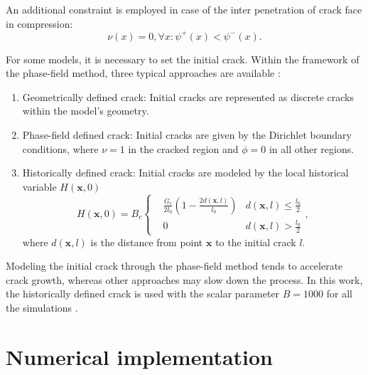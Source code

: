 \documentclass[times,fleqn,11pt]{elsarticle}
\begin{document}
An additional constraint is employed in case of the inter penetration of crack face in compression:
\begin{equation}
     \nu(x)=0, \forall x: \psi^+(x)<\psi^-(x).
\end{equation}

For some models, it is necessary to set the initial crack. Within the framework of the phase-field method, three typical approaches are available \cite{sargado_high-accuracy_2018}: 
\begin{enumerate}
    \item Geometrically defined crack: Initial cracks are represented as discrete cracks within the model's geometry.
    \item Phase-field defined crack: Initial cracks are given by the Dirichlet boundary conditions, where $\nu=1$ in the cracked region and $\phi=0$ in all other regions. 
    \item Historically defined crack: Initial cracks are modeled by the local historical variable $H(\mathbf{x},0)$
    \begin{equation}\label{historical variable}
        H(\mathbf{x},0)=B_c\left\{ 
            \begin{aligned}
                &\frac{G_c}{2l_0}(1-\frac{2d(\mathbf{x},l)}{l_0}) & d(\mathbf{x},l)\leq \frac{l_0}{2} \\
                &0 & d(\mathbf{x},l) > \frac{l_0}{2}
            \end{aligned}
         \right.,
    \end{equation}
    where $d(\mathbf{x},l)$ is the distance from point $\mathbf{x}$ to the initial crack $l$.
\end{enumerate}

Modeling the initial crack through the phase-field method tends to accelerate crack growth, whereas other approaches may slow down the process. In this work, the historically defined crack is used with the scalar parameter $B=1000$ for all the simulations \cite{borden_phase-field_2012}.

\section{Numerical implementation}\label{Section3}
\end{document}
